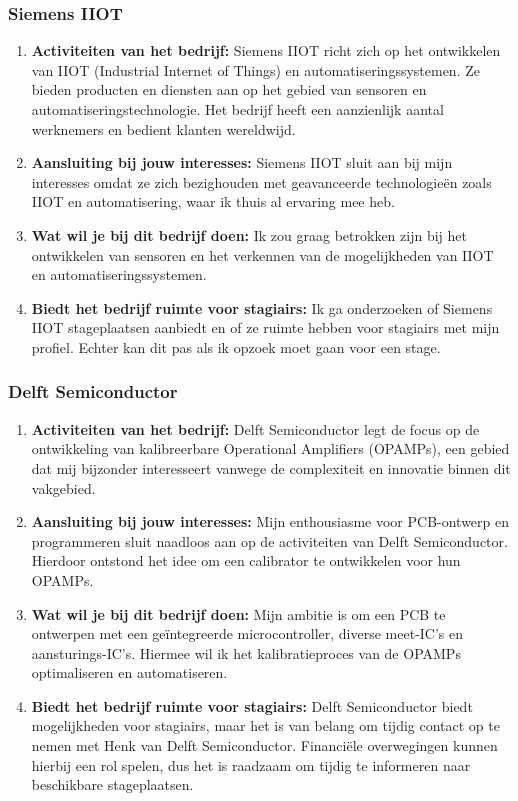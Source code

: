 \subsubsection{Siemens IIOT}
\begin{enumerate}
    \item \textbf{Activiteiten van het bedrijf:} Siemens IIOT richt zich op het ontwikkelen van IIOT (Industrial Internet of Things) en automatiseringssystemen. Ze bieden producten en diensten aan op het gebied van sensoren en automatiseringstechnologie. Het bedrijf heeft een aanzienlijk aantal werknemers en bedient klanten wereldwijd.
    \item \textbf{Aansluiting bij jouw interesses:} Siemens IIOT sluit aan bij mijn interesses omdat ze zich bezighouden met geavanceerde technologieën zoals IIOT en automatisering, waar ik thuis al ervaring mee heb.
    \item \textbf{Wat wil je bij dit bedrijf doen:} Ik zou graag betrokken zijn bij het ontwikkelen van sensoren en het verkennen van de mogelijkheden van IIOT en automatiseringssystemen.
    \item \textbf{Biedt het bedrijf ruimte voor stagiairs:} Ik ga onderzoeken of Siemens IIOT stageplaatsen aanbiedt en of ze ruimte hebben voor stagiairs met mijn profiel. Echter kan dit pas als ik opzoek moet gaan voor een stage.
\end{enumerate}

\subsubsection{Delft Semiconductor}
\begin{enumerate}
    \item \textbf{Activiteiten van het bedrijf:} Delft Semiconductor legt de focus op de ontwikkeling van kalibreerbare Operational Amplifiers (OPAMPs), een gebied dat mij bijzonder interesseert vanwege de complexiteit en innovatie binnen dit vakgebied.
    \item \textbf{Aansluiting bij jouw interesses:} Mijn enthousiasme voor PCB-ontwerp en programmeren sluit naadloos aan op de activiteiten van Delft Semiconductor. Hierdoor ontstond het idee om een calibrator te ontwikkelen voor hun OPAMPs.
    \item \textbf{Wat wil je bij dit bedrijf doen:} Mijn ambitie is om een PCB te ontwerpen met een geïntegreerde microcontroller, diverse meet-IC's en aansturings-IC's. Hiermee wil ik het kalibratieproces van de OPAMPs optimaliseren en automatiseren.
    \item \textbf{Biedt het bedrijf ruimte voor stagiairs:} Delft Semiconductor biedt mogelijkheden voor stagiairs, maar het is van belang om tijdig contact op te nemen met Henk van Delft Semiconductor. Financiële overwegingen kunnen hierbij een rol spelen, dus het is raadzaam om tijdig te informeren naar beschikbare stageplaatsen.
\end{enumerate}